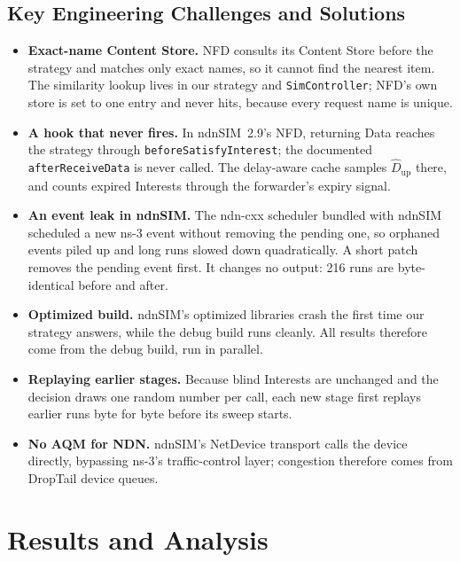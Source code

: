 \documentclass[11pt,a4paper]{article}
\newcommand{\code}[1]{\texttt{#1}}
\newcommand{\Dup}{\hat{D}_{\mathrm{up}}}
\begin{document}
\subsection{Key Engineering Challenges and Solutions}
\begin{itemize}
  \item \textbf{Exact-name Content Store.} NFD consults its Content Store before the strategy and
        matches only exact names, so it cannot find the nearest item. The similarity lookup lives in
        our strategy and \code{SimController}; NFD's own store is set to one entry and never hits,
        because every request name is unique.
  \item \textbf{A hook that never fires.} In ndnSIM~2.9's NFD, returning Data reaches the strategy
        through \code{beforeSatisfyInterest}; the documented \code{afterReceiveData} is never
        called. The delay-aware cache samples $\Dup$ there, and counts expired Interests through the
        forwarder's expiry signal.
  \item \textbf{An event leak in ndnSIM.} The ndn-cxx scheduler bundled with ndnSIM scheduled a new
        ns-3 event without removing the pending one, so orphaned events piled up and long runs
        slowed down quadratically. A short patch removes the pending event first. It changes
        no output: 216 runs are byte-identical before and after.
  \item \textbf{Optimized build.} ndnSIM's optimized libraries crash the first time our strategy
        answers, while the debug build runs cleanly. All results therefore come from the debug
        build, run in parallel.
  \item \textbf{Replaying earlier stages.} Because blind Interests are unchanged and the decision
        draws one random number per call, each new stage first replays earlier runs byte for byte
        before its sweep starts.
  \item \textbf{No AQM for NDN.} ndnSIM's NetDevice transport calls the device directly, bypassing
        ns-3's traffic-control layer; congestion therefore comes from DropTail device queues.
\end{itemize}

\section{Results and Analysis}\label{sec:results}
\end{document}

